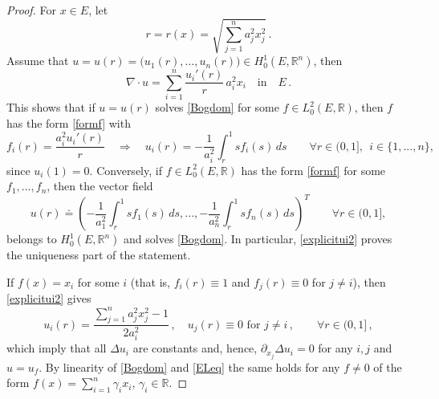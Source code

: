 \documentclass[11pt]{article}
\theoremstyle{plain}
\theoremstyle{definition}
\numberwithin{equation}{section}
\newcommand{\R}{\mathbb{R}}
\begin{document}
\begin{proof} For $x \in E$, let
	$$r=r(x)=\sqrt{\sum_{j=1}^na_j^2x_j^2}\, .$$
	Assume that $u=u(r)=\big(u_1(r),...,u_n(r)\big)\in H^1_0(E,\R^n)$, then
	$$
	\nabla\cdot u=\sum_{i=1}^{n}\frac{u_i'(r)}{r}\, a_i^2x_i \quad \mbox{in} \quad E\, .
	$$
	This shows that if $u=u(r)$ solves \eqref{Bogdom} for some $f\in L^2_0(E,\R)$, then $f$ has the form \eqref{formf} with
	\begin{equation}\label{explicitui2}
	f_i(r) = \frac{a_i^2 u_i'(r)}{r} \quad \Longrightarrow \quad u_i(r)=-\frac{1}{a_i^2}\int_{r}^1sf_i(s)\, ds \qquad \forall r \in (0,1],
	\ \ i\in\{1,...,n \},
	\end{equation}
	since $u_i(1)=0$. Conversely, if $f\in L^2_0(E,\R)$ has the form \eqref{formf} for some $f_1,...,f_n$, then the vector field
	\begin{equation} \label{solradial2}
	u(r) \doteq \left( -\frac{1}{a_1^2}\int_{r}^1sf_1(s) \, ds, ..., -\frac{1}{a_n^2}\int_{r}^1sf_n(s) \, ds  \right)^T \qquad
	\forall r \in(0,1],
	\end{equation}
	belongs to $H^1_0(E,\R^n)$ and solves \eqref{Bogdom}. In particular, \eqref{explicitui2} proves the uniqueness part of the statement.\par
	If $f(x)=x_i$ for some $i$ (that is, $f_i(r)\equiv1$ and $f_j(r)\equiv0$ for $j\neq i$), then \eqref{explicitui2} gives
	\begin{equation}\label{uifi}
	u_i(r)=\frac{\sum_{j=1}^{n}a_j^2x_j^2-1}{2a_i^2}\, ,\quad u_j(r)\equiv0\mbox{ for }j\neq i\, ,\qquad \forall r \in (0,1]\, ,
	\end{equation}
	which imply that all $\Delta u_i$ are constants and, hence, $\partial_{x_j}\Delta u_i=0$ for any $i,j$ and $u=u_f$. By linearity of
\eqref{Bogdom} and \eqref{ELeq} the same holds for any $f\not=0$ of the form $f(x)=\sum^n_{i=1}\gamma_i x_i$, $\gamma_i\in \R$.


\end{proof}
\end{document}

